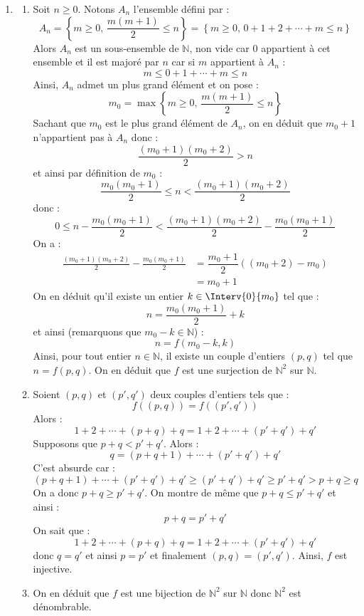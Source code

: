 \documentclass[a4paper,10pt]{report}
\begin{document}
\begin{enumerate}
\item 
\begin{enumerate}
\item Soit $n \geq 0$. Notons $A_n$ l'ensemble défini par :
$$ A_n = \left\lbrace m \geq 0, \, \frac{m(m+1)}{2} \leq n \right\rbrace = \left\lbrace m \geq 0, \, 0+1+2+ \cdots + m \leq n \right\rbrace$$
Alors $A_n$ est un sous-ensemble de $\mathbb{N}$, non vide car $0$ appartient à cet ensemble et il est majoré par $n$ car si $m$ appartient à $A_n$ :
$$ m \leq 0+1+ \cdots + m \leq n$$
Ainsi, $A_n$ admet un plus grand élément et on pose :
$$ m_0 = \max \left\lbrace m \geq 0, \, \frac{m(m+1)}{2} \leq n \right\rbrace$$
Sachant que $m_0$ est le plus grand élément de $A_n$, on en déduit que $m_0+1$ n'appartient pas à $A_n$ donc :
$$ \frac{(m_0+1)(m_0+2)}{2} > n$$
et ainsi par définition de $m_0$ :
$$ \frac{m_0(m_0+1)}{2} \leq n  <\frac{(m_0+1)(m_0+2)}{2}$$
donc :
$$   0 \leq  n- \frac{m_0(m_0+1)}{2} <\frac{(m_0+1)(m_0+2)}{2} - \frac{m_0(m_0+1)}{2}$$
On a :
\begin{align*}
\frac{(m_0+1)(m_0+2)}{2} - \frac{m_0(m_0+1)}{2} & = \dfrac{m_0+1}{2} ((m_0+2)-m_0) \\
& = m_0+1 
\end{align*}
On en déduit qu'il existe un entier $k \in \Interv{0}{m_0}$ tel que :
$$ n = \frac{m_0(m_0+1)}{2} + k$$
et ainsi (remarquons que $m_0-k \in \mathbb{N}$) : 
$$ n = f(m_0-k,k)$$
Ainsi, pour tout entier $n \in \mathbb{N}$, il existe un couple d'entiers $(p,q)$ tel que $n=f(p,q)$. On en déduit que $f$ est une surjection de $\mathbb{N}^2$ sur $\mathbb{N}$.
\item Soient $(p,q)$ et $(p',q')$ deux couples d'entiers tels que :
$$ f((p,q))=f((p',q'))$$
Alors :
$$ 1+2+ \cdots + (p+q) + q = 1+2+ \cdots + (p'+q') + q'$$
Supposons que $p+q<p'+q'$. Alors :
$$ q= (p+q+1)+ \cdots +(p'+q') + q'$$
C'est absurde car :
$$ (p+q+1)+ \cdots +(p'+q') + q' \geq (p'+q')+q' \geq p'+q'>p+q \geq q$$
On a donc $p+q \geq p'+q'$. On montre de même que $p+q \leq p'+q'$ et ainsi :
$$ p+q = p'+q'$$
On sait que :
$$  1+2+ \cdots + (p+q) + q = 1+2+ \cdots + (p'+q') + q'$$
donc $q=q'$ et ainsi $p=p'$ et finalement $(p,q)=(p',q')$. Ainsi, $f$ est injective.
\item On en déduit que $f$ est une bijection de $\mathbb{N}^2$ sur $\mathbb{N}$ donc $\mathbb{N}^2$ est dénombrable.
\end{enumerate}
\end{enumerate}
\end{document}
